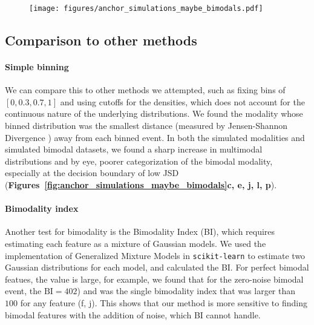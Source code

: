 \clearpage
\begin{figure}[h]
\ContinuedFloat
\captionsetup{labelformat=empty}
\centering
\texttt{[image: figures/anchor\_simulations\_maybe\_bimodals.pdf]}
\end{figure}
\addtocounter{figure}{1}
\clearpage


\subsection{Comparison to other methods}

\paragraph{Simple binning}
We can compare this to other methods we attempted, such as fixing bins of $[0, 0.3, 0.7, 1]$ and using cutoffs for the densities, which does not account for the continuous nature of the underlying distributions. We found the modality whose binned distribution was the smallest distance (measured by Jensen-Shannon Divergence \cite{Cover:2011vn}) away from each binned event. In both the simulated modalities and simulated bimodal datasets, we found a sharp increase in multimodal distributions and by eye, poorer categorization of the bimodal modality, especially at the decision boundary of low JSD (\textbf{Figures~\cref{fig:anchor_simulations_maybe_bimodals}c, e, j, l, p}).



\paragraph{Bimodality index}
Another test for bimodality is the Bimodality Index \cite{Wang:2009wm} (BI), which requires estimating each feature as a mixture of Gaussian models. We used the implementation of Generalized Mixture Models in \texttt{scikit-learn} \cite{Pedregosa:2011tv} to estimate two Gaussian distributions for each model, and calculated the BI. For perfect bimodal featues, the value is large, for example, we found that for the zero-noise bimodal event, the $\mathrm{BI}=402$) and was the single bimodality index that was larger than $100$ for any feature (f, j). This shows that our method is more sensitive to finding bimodal features with the addition of noise, which BI cannot handle.

